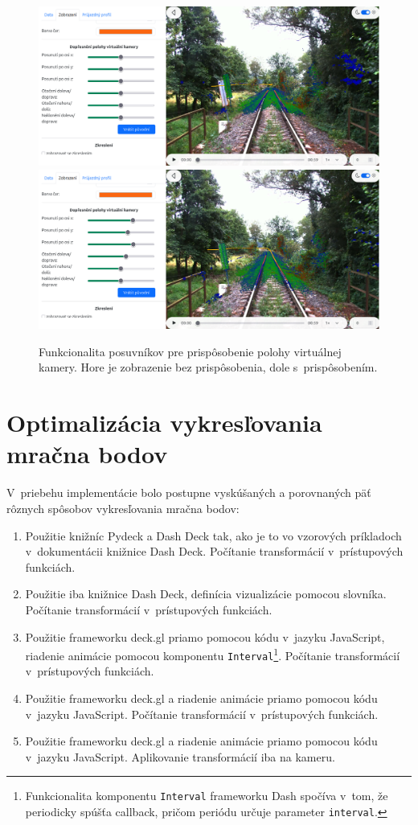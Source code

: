 \begin{figure}[h]
    \centering
    \includegraphics[width=0.9\linewidth]{text_prace/obrazky-figures/posuvniky1.png}
    \includegraphics[width=0.9\linewidth]{text_prace/obrazky-figures/posuvniky2.png}
    \caption[Funkcionalita posuvníkov pre prispôsobenie polohy virtuálnej kamery.]{Funkcionalita posuvníkov pre prispôsobenie polohy virtuálnej kamery. Hore je zobrazenie bez prispôsobenia, dole s~prispôsobením.}
    \label{fig:posuvniky}
\end{figure}

\section{Optimalizácia vykresľovania mračna bodov}

V~priebehu implementácie bolo postupne vyskúšaných a porovnaných päť rôznych spôsobov vykresľovania mračna bodov:
\begin{enumerate}
    \item Použitie knižníc Pydeck a Dash Deck tak, ako je to vo vzorových príkladoch v~dokumentácii knižnice Dash Deck. Počítanie transformácií v~prístupových funkciách.
    \item Použitie iba knižnice Dash Deck, definícia vizualizácie pomocou slovníka. Počítanie transformácií v~prístupových funkciách.
    \item Použitie frameworku deck.gl priamo pomocou kódu v~jazyku JavaScript, riadenie animácie pomocou komponentu \texttt{Interval}\footnote{Funkcionalita komponentu \texttt{Interval} frameworku Dash spočíva v~tom, že periodicky spúšťa callback, pričom periódu určuje parameter \texttt{interval}.}. Počítanie transformácií v~prístupových funkciách. 
    \item Použitie frameworku deck.gl a riadenie animácie priamo pomocou kódu v~jazyku JavaScript. Počítanie transformácií v~prístupových funkciách.
    \item Použitie frameworku deck.gl a riadenie animácie priamo pomocou kódu v~jazyku JavaScript. Aplikovanie transformácií iba na kameru.
\end{enumerate}

